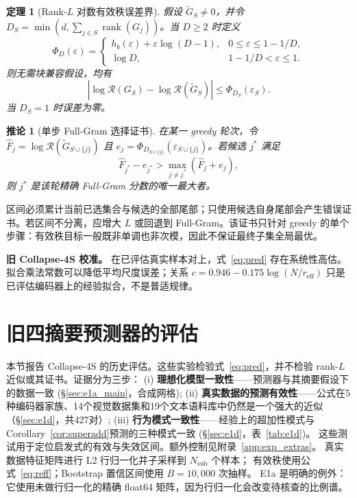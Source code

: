 \documentclass{article}
\newcommand{\reff}{\ensuremath{r_{\mathrm{eff}}}\xspace}
\newtheorem{theorem}{定理}
\newtheorem{corollary}[lemma]{推论}
\begin{document}
\begin{theorem}[Rank-$L$ 对数有效秩误差界]
\label{thm:rank_l_bound}
假设 $\widetilde G_S\neq0$，并令
$D_S=\min(d,\sum_{j\in S}\operatorname{rank}(G_j))$。当 $D\ge2$ 时定义
\begin{equation}
 \Phi_D(\varepsilon)=
 \begin{cases}
 h_b(\varepsilon)+\varepsilon\log(D-1),
 &0\leq\varepsilon\leq1-1/D,\\
 \log D,&1-1/D<\varepsilon\leq1.
 \end{cases}
\end{equation}
则无需块兼容假设，均有
\begin{equation}
 \left|\log\mathcal R(G_S)-\log\mathcal R(\widetilde G_S)\right|
 \leq \Phi_{D_S}(\varepsilon_S).
 \label{eq:rank_l_bound}
\end{equation}
当 $D_S=1$ 时误差为零。
\end{theorem}

\begin{corollary}[单步 Full-Gram 选择证书]
\label{cor:rank_l_choice}
在某一 greedy 轮次，令
$\widehat F_j=\log\mathcal R(\widetilde G_{S\cup\{j\}})$ 且
$e_j=\Phi_{D_{S\cup\{j\}}}(\varepsilon_{S\cup\{j\}})$。若候选 $j^*$ 满足
\begin{equation}
 \widehat F_{j^*}-e_{j^*}>
 \max_{j\neq j^*}(\widehat F_j+e_j),
 \label{eq:rank_l_certificate}
\end{equation}
则 $j^*$ 是该轮精确 Full-Gram 分数的唯一最大者。
\end{corollary}

区间必须累计当前已选集合与候选的全部尾部；只使用候选自身尾部会产生错误证书。若区间不分离，应增大 $L$ 或回退到 Full-Gram。该证书只针对 greedy 的单个步骤：有效秩目标一般既非单调也非次模，因此不保证最终子集全局最优。

\textbf{旧 Collapse-4S 校准。}
在已评估真实样本对上，式~\eqref{eq:pred} 存在系统性高估。拟合乘法常数可以降低平均尺度误差；关系 $c{=}0.946{-}0.175\log(N/\reff)$ 只是已评估编码器上的经验拟合，不是普适规律。
\section{旧四摘要预测器的评估}
\label{sec:experiments}

本节报告 Collapse-4S 的历史评估。这些实验检验式~\eqref{eq:pred}，并不检验 rank-$L$ 近似或其证书。证据分为三步：
(i) \textbf{理想化模型一致性}——预测器与其摘要假设下的数据一致 (§\ref{sec:e1a_main}，合成网格);
(ii) \textbf{真实数据的预测有效性}——公式在5种编码器家族、14个视觉数据集和19个文本语料库中仍然是一个强大的近似（§\ref{sec:e1d}，共427对）;
(iii) \textbf{行为模式一致性}——经验上的超加性模式与Corollary~\ref{cor:superadd}预测的三种模式一致 (§\ref{sec:e1d}，表~\ref{tab:e1d})。
这些测试用于定位启发式的有效与失效区间。额外控制见附录~\ref{app:exp_extras}。
真实数据特征矩阵进行 L2 行归一化并子采样到 $N_{\mathrm{sub}}$ 个样本；
有效秩使用公式~\eqref{eq:reff}；Bootstrap 置信区间使用 $B=10{,}000$ 次抽样。
E1a 是明确的例外：它使用未做行归一化的精确 float64 矩阵，因为行归一化会改变待核查的比例谱。
\end{document}
